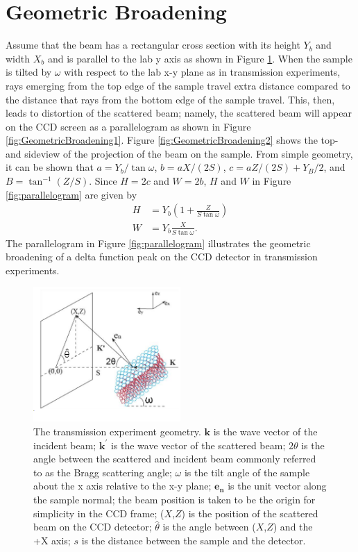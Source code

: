 \documentclass[letterpaper,12pt]{article}
\begin{document}
\section{Geometric Broadening}
Assume that the beam has a rectangular cross section with its height $Y_b$ and width $X_b$ and is parallel to the lab y axis as shown in Figure \ref{fig:TransmissionGeometry}. When the sample is tilted by $\omega$ with respect to the lab x-y plane as in transmission experiments, rays emerging from the top edge of the sample travel extra distance compared to the distance that rays from the bottom edge of the sample travel. This, then, leads to distortion of the scattered beam; namely, the scattered beam will appear on the CCD screen as a parallelogram as shown in Figure \ref{fig:GeometricBroadening1}. Figure \ref{fig:GeometricBroadening2} shows the top- and sideview of the projection of the beam on the sample. From simple geometry, it can be shown that $a=Y_b/\tan\omega$, $b=aX/(2S)$, $c=aZ/(2S)+Y_B/2$, and $B=\tan^{-1}(Z/S)$. Since $H=2c$ and $W=2b$, $H$ and $W$ in Figure \ref{fig:parallelogram} are given by
\begin{align}
	H &= Y_b\left(1+\frac{Z}{S\tan\omega}\right)\\
	W &= Y_b\frac{X}{S\tan\omega}.
\end{align}
The parallelogram in Figure \ref{fig:parallelogram} illustrates the geometric broadening of a delta function peak on the CCD detector in transmission experiments. 
\begin{figure}[htbp]
	\centering
	\includegraphics[width=0.5\textwidth]{TransmissionGeometry}
	\caption[The transmission experiment geometry]{The transmission experiment geometry. $\mathbf{k}$ is the wave vector of the incident beam; $\mathbf{k^{'}}$ is the wave vector of the scattered beam; $2\theta$ is the angle between the scattered and incident beam commonly referred to as the Bragg scattering angle; $\omega$ is the tilt angle of the sample about the x axis relative to the x-y plane;  $\mathbf{e_n}$ is the unit vector along the sample normal; the beam position is taken to be the origin for simplicity in the CCD frame; ($X$,$Z$) is the position of the scattered beam on the CCD detector; $\hat{\theta}$ is the angle between ($X$,$Z$) and the +X axis; $s$ is the distance between the sample and the detector.}
	\label{fig:TransmissionGeometry}
\end{figure}
\end{document}
